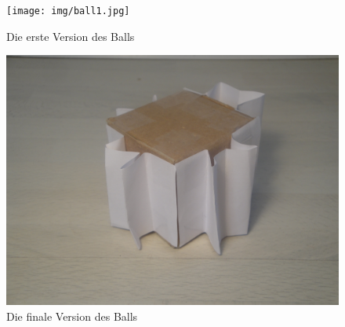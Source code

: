 \documentclass{fetch-my-doc}
\begin{document}
      \begin{center}
        \begin{minipage}[t]{.49\textwidth}
          \begin{figure}[H]%
            \centering%
            \texttt{[image: img/ball1.jpg]}%
            \caption{Die erste Version des Balls}%
            \label{img:ballv1}%
          \end{figure}
        \end{minipage}
        \hfill
        \begin{minipage}[t]{.49\textwidth}
          \begin{figure}[H]%
            \centering%
            \includegraphics[width=\columnwidth]{img/ball2.jpg}%
            \caption{Die finale Version des Balls}%
            \label{img:ballFinal}%
          \end{figure}
        \end{minipage}
      \end{center}

				
\end{document}
